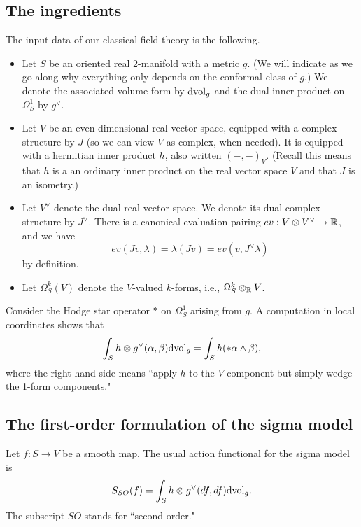 \subsection{The ingredients}

The input data of our classical field theory is the following.

\begin{itemize}
\item Let $S$ be an oriented real 2-manifold with a metric $g$. (We will indicate as we go along why everything only depends on the conformal class of $g$.) We denote the associated volume form by ${\rm dvol}_g$ and the dual inner product on $\Omega^1_S$ by $g^\vee$.

\item Let $V$ be an even-dimensional real vector space, equipped with a complex structure by $J$ (so we can view $V$ as complex, when needed). It is equipped with a hermitian inner product $h$, also written $(-,-)_V$. (Recall this means that $h$ is a an ordinary inner product on the real vector space $V$ and that $J$ is an isometry.)

\item Let $V^\vee$ denote the dual real vector space. We denote its dual complex structure by $J^\vee$. There is a canonical evaluation pairing $ev: V \otimes V^\vee \to \mathbb R$, and we have 
\[
ev(Jv,\lambda) = \lambda(Jv) = ev(v,J^\vee \lambda)
\]
by definition.

\item Let $\Omega^k_S(V)$ denote the $V$-valued $k$-forms, i.e., $\Omega^k_S \otimes_\mathbb R V$.

\end{itemize}

Consider the Hodge star operator $\ast$ on $\Omega^1_S$ arising from $g$. A computation in local coordinates shows that 
\[
\int_S h \otimes g^\vee(\alpha, \beta) {\rm dvol}_g = \int_S h( \ast \alpha \wedge \beta),
\]
where the right hand side means ``apply $h$ to the $V$-component but simply wedge the 1-form components." 

\subsection{The first-order formulation of the sigma model}

Let $f: S \to V$ be a smooth map. The usual action functional for the sigma model is
\[
S_{SO}(f) =  \int_S h \otimes g^\vee(df, df) {\rm dvol}_g.
\]
The subscript $SO$ stands for ``second-order."

